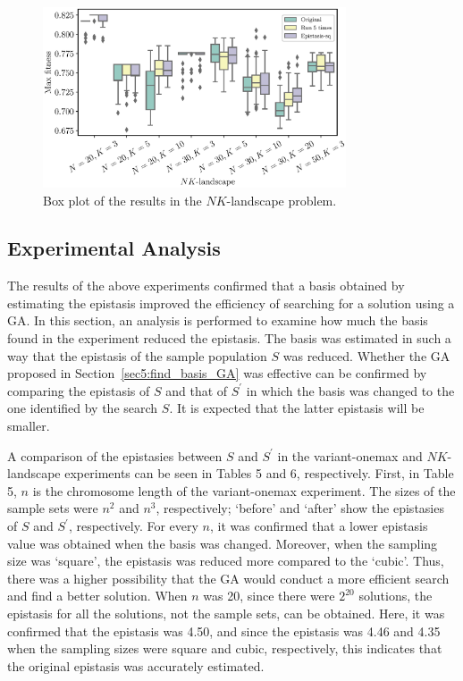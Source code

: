\begin{figure}[ht!]
	\centering
	\includegraphics[width=0.8\textwidth]{./boxplot_NK}
	\caption{Box plot of the results in the $ NK $-landscape problem.} \label{fig:boxplot_nk}
\end{figure}

\subsection{Experimental Analysis}
The results of the above experiments confirmed that a basis obtained by estimating the epistasis improved the efficiency of searching for a solution using a GA. In this section, an analysis is performed to examine how much the basis found in the experiment reduced the epistasis. The basis was estimated in such a way that the epistasis of the sample population $ S $ was reduced. Whether the GA proposed in Section~\ref{sec5:find_basis_GA} was effective can be confirmed by comparing the epistasis of $ S $ and that of $ S^\prime $ in which the basis was changed to the one identified by the search $ S $. It is expected that the latter epistasis will be smaller.

A comparison of the epistasies between $ S $ and $ S^\prime $ in the variant-onemax and $ NK $-landscape experiments can be seen in Tables 5 and 6, respectively. First, in Table 5, $ n $ is the chromosome length of the variant-onemax experiment. The sizes of the sample sets were $ n^2 $ and $ n^3 $, respectively; `before' and `after' show the epistasies of $ S $ and $ S^\prime $, respectively. For every $ n $, it was confirmed that a lower epistasis value was obtained when the basis was changed. Moreover, when the sampling size was `square', the epistasis was reduced more compared to the `cubic'. Thus, there was a higher possibility that the GA would conduct a more efficient search and find a better solution. When $ n $ was 20, since there were $ 2^{20} $ solutions, the epistasis for all the solutions, not the sample sets, can be obtained. Here, it was confirmed that the epistasis was 4.50, and since the epistasis was 4.46 and 4.35 when the sampling sizes were square and cubic, respectively, this indicates that the original epistasis was accurately estimated.

